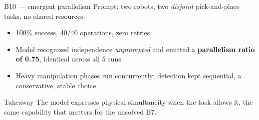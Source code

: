 \documentclass[aspectratio=169,11pt]{beamer}
\begin{document}
\begin{frame}{B10 --- emergent parallelism}
	\footnotesize Prompt: two robots, two \emph{disjoint} pick-and-place tasks, no shared resources.
	\vspace{0.5em}
	\begin{itemize}
		\item \alert{100\%} success, 40/40 operations, zero retries.
		\item Model recognized independence \emph{unprompted} and emitted a
		      \textbf{parallelism ratio of 0.75}, identical across all 5 runs.
		\item Heavy manipulation phases run concurrently; detection kept sequential, a
		      conservative, stable choice.
	\end{itemize}
	\vfill
	\begin{exampleblock}{Takeaway}
		The model expresses physical simultaneity when the task allows it,
		the same capability that matters for the unsolved B7.
	\end{exampleblock}
\end{frame}
\end{document}
